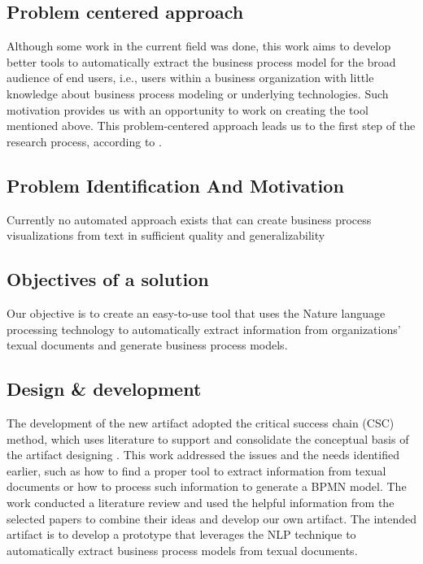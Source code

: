 \subsection{Problem centered approach}
Although some work in the current field was done, this work aims to develop better tools to automatically extract the business process model for the broad audience of end users, i.e., users within a business organization with little knowledge about business process modeling or underlying technologies. Such motivation provides us with an opportunity to work on creating the tool mentioned above. This problem-centered approach leads us to the first step of the research process, according to \cite{DSM_2}.

\subsection{Problem Identification And Motivation}
Currently no automated approach exists that can create business process visualizations from text in sufficient quality and generalizability


\subsection{Objectives of a solution}
Our objective is to create an easy-to-use tool that uses the Nature language processing technology to automatically extract information from organizations' texual documents and generate business process models.

\subsection{Design \& development}
The development of the new artifact adopted the critical success chain (CSC) method, which uses literature to support and consolidate the conceptual basis of the artifact designing \cite{DSM_2}. This work addressed the issues and the needs identified earlier, such as how to find a proper tool to extract information from texual documents or how to process such information to generate a BPMN model. The work conducted a literature review and used the helpful information from the selected papers to combine their ideas and develop our own artifact. The intended artifact is to develop a prototype that leverages the NLP technique to automatically extract business process models from texual documents.

